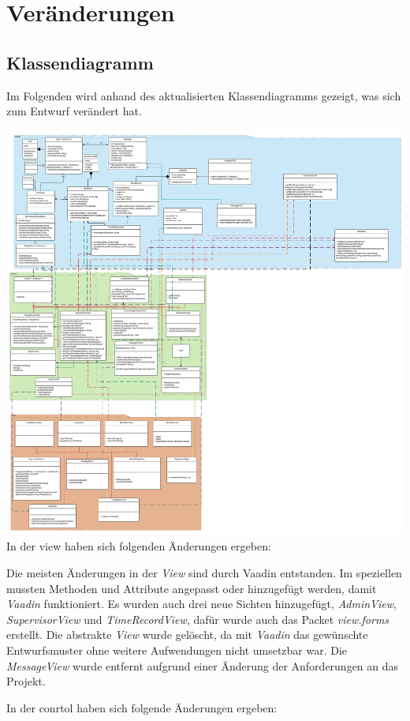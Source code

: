 \section{Veränderungen}
\subsection{Klassendiagramm}
Im Folgenden wird anhand des aktualisierten Klassendiagramms gezeigt, was sich zum Entwurf verändert hat.

\includegraphics{Class Diagramm_alt.svg}
In der view haben sich folgenden Änderungen ergeben:

Die meisten Änderungen in der \emph{View} sind durch Vaadin entstanden. 
Im speziellen mussten Methoden und Attribute angepasst oder hinzugefügt werden, 
damit \emph{Vaadin} funktioniert.
Es wurden auch drei neue Sichten hinzugefügt, \emph{AdminView}, \emph{SupervisorView} und \emph{TimeRecordView}, 
dafür wurde auch das Packet \emph{view.forms} erstellt.
Die abstrakte \emph{View} wurde gelöscht, da mit \emph{Vaadin} das gewünschte Entwurfsmuster 
ohne weitere Aufwendungen nicht umsetzbar war.
Die \emph{MessageView} wurde entfernt aufgrund einer Änderung der Anforderungen an das Projekt.

In der conrtol haben sich folgende Änderungen ergeben:


